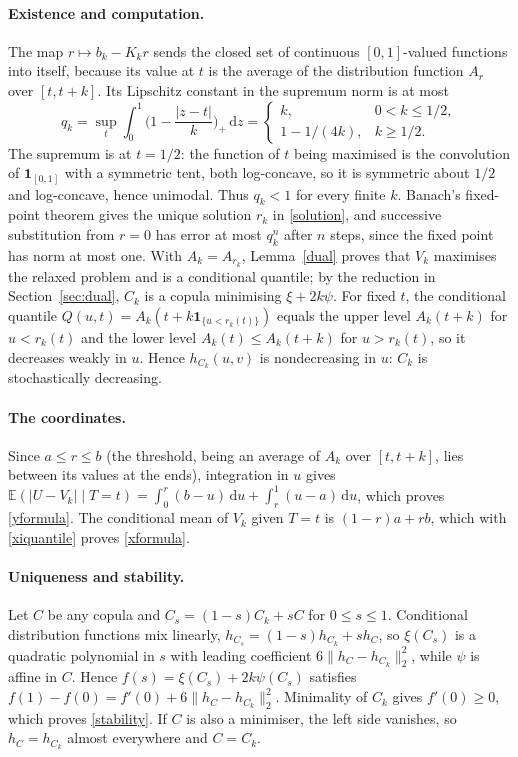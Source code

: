 \documentclass[11pt,a4paper]{article}
\theoremstyle{remark}
\newcommand{\E}{\mathbb E}
\newcommand{\1}{\mathbf 1}
\newcommand{\dd}{\,\mathrm d}
\begin{document}
\paragraph{Existence and computation.} The map $r\mapsto b_k-K_kr$ sends the closed set of continuous $[0,1]$-valued functions into itself, because its value at $t$ is the average of the distribution function $A_r$ over $[t,t+k]$. Its Lipschitz constant in the supremum norm is at most
\[
 q_k=\sup_t\int_0^1\Big(1-\frac{|z-t|}{k}\Big)_+\dd z
 =\begin{cases} k,&0<k\le1/2,\\ 1-1/(4k),& k\ge1/2.\end{cases}
\]
The supremum is at $t=1/2$: the function of $t$ being maximised is the convolution of $\1_{[0,1]}$ with a symmetric tent, both log-concave, so it is symmetric about $1/2$ and log-concave, hence unimodal. Thus $q_k<1$ for every finite $k$. Banach's fixed-point theorem gives the unique solution $r_k$ in \eqref{solution}, and successive substitution from $r=0$ has error at most $q_k^n$ after $n$ steps, since the fixed point has norm at most one. With $A_k=A_{r_k}$, Lemma~\ref{dual} proves that $V_k$ maximises the relaxed problem and is a conditional quantile; by the reduction in Section~\ref{sec:dual}, $C_k$ is a copula minimising $\xi+2k\psi$. For fixed $t$, the conditional quantile $Q(u,t)=A_k(t+k\1_{\{u<r_k(t)\}})$ equals the upper level $A_k(t+k)$ for $u<r_k(t)$ and the lower level $A_k(t)\le A_k(t+k)$ for $u>r_k(t)$, so it decreases weakly in $u$. Hence $h_{C_k}(u,v)$ is nondecreasing in $u$: $C_k$ is stochastically decreasing.

\paragraph{The coordinates.} Since $a\le r\le b$ (the threshold, being an average of $A_k$ over $[t,t+k]$, lies between its values at the ends), integration in $u$ gives $\E(|U-V_k|\mid T=t)=\int_0^r(b-u)\dd u+\int_r^1(u-a)\dd u$, which proves \eqref{yformula}. The conditional mean of $V_k$ given $T=t$ is $(1-r)a+rb$, which with \eqref{xiquantile} proves \eqref{xformula}.

\paragraph{Uniqueness and stability.} Let $C$ be any copula and $C_s=(1-s)C_k+sC$ for $0\le s\le1$. Conditional distribution functions mix linearly, $h_{C_s}=(1-s)h_{C_k}+sh_C$, so $\xi(C_s)$ is a quadratic polynomial in $s$ with leading coefficient $6\|h_C-h_{C_k}\|_2^2$, while $\psi$ is affine in $C$. Hence $f(s)=\xi(C_s)+2k\psi(C_s)$ satisfies $f(1)-f(0)=f'(0)+6\|h_C-h_{C_k}\|_2^2$. Minimality of $C_k$ gives $f'(0)\ge0$, which proves \eqref{stability}. If $C$ is also a minimiser, the left side vanishes, so $h_C=h_{C_k}$ almost everywhere and $C=C_k$.
\end{document}
